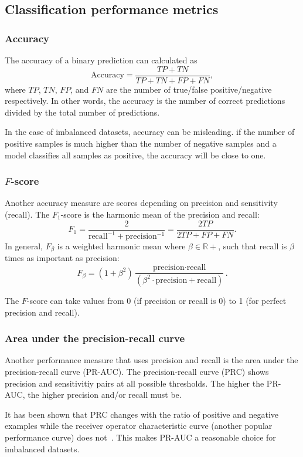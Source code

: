 \subsection{Classification performance metrics}

\subsubsection{Accuracy}

The accuracy of a binary prediction can calculated as
\begin{equation}
    \text{Accuracy} = \frac{TP + TN}{TP + TN + FP + FN},
\end{equation}
where $TP$, $TN$, $FP$, and $FN$ are the number of true/false positive/negative respectively.
In other words, the accuracy is the number of correct predictions divided by the total number of predictions.

In the case of imbalanced datasets, accuracy can be misleading.
\eg if the number of positive samples is much higher than the number of negative samples and a model classifies all samples as positive, the accuracy will be close to one.

\subsubsection{$F$-score}

Another accuracy measure are scores depending on precision and sensitivity (recall).
The $F_1$-score is the harmonic mean of the precision and recall:
\begin{equation}
    F_1 = \frac{2}{\text{recall}^{-1} + \text{precision}^{-1}} = \frac{2 TP}{2 TP + FP + FN}.
\end{equation}
In general, $F_\beta$ is a weighted harmonic mean where $\beta\in\mathbb{R}+$, such that recall is $\beta$ times as important as precision:
\begin{equation}
    F_\beta = (1+\beta^2)\frac{\text{precision}\cdot\text{recall}}{(\beta^2\cdot\text{precision}+\text{recall})}.
\end{equation} 

The $F$-score can take values from 0 (if precision or recall is 0) to 1 (for perfect precision and recall).

\subsubsection{Area under the precision-recall curve}
Another performance measure that uses precision and recall is the area under the precision-recall curve (PR-AUC).
The precision-recall curve (PRC) shows precision and sensitivitiy pairs at all possible thresholds.
The higher the PR-AUC, the higher precision and/or recall must be.

It has been shown that PRC changes with the ratio of positive and negative examples while the receiver operator characteristic curve (another popular performance curve) does not~\cite{Takaya2015}.
This makes PR-AUC a reasonable choice for imbalanced datasets.
